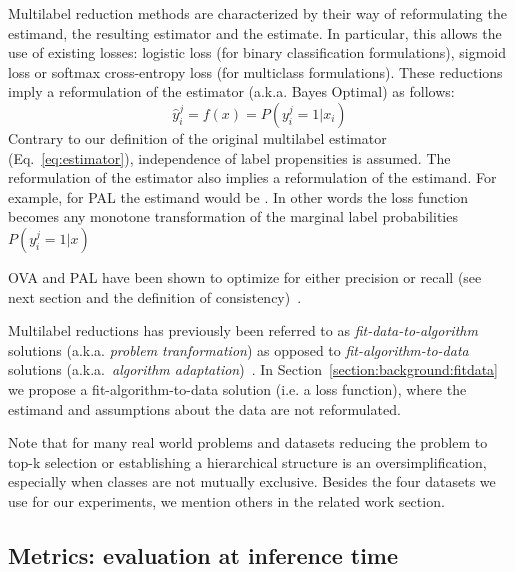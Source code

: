 \vspace{\baselineskip}

Multilabel reduction methods are characterized by their way of reformulating the estimand, the resulting estimator and the estimate. In particular, this allows the use of existing losses: logistic loss (for binary classification formulations), sigmoid loss or softmax cross-entropy loss (for multiclass formulations). These reductions imply a reformulation of the estimator (a.k.a. Bayes Optimal) as follows:
%
\begin{equation}
  \hat{y}_i^j = f(x) = P(y_i^j = 1 | x_i)
\end{equation}
%
Contrary to our definition of the original multilabel estimator (Eq.~\ref{eq:estimator}), independence of label propensities is assumed. The reformulation of the estimator also implies a reformulation of the estimand. For example, for PAL the estimand would be . In other words the loss function becomes any monotone transformation of the marginal label probabilities $ P(y_i^j = 1 | x)$ ~\cite{OVA2, multilabelMetrics, unifiedView}

OVA and PAL have been shown to optimize for either precision or recall (see next section and the definition of consistency)~\cite{multilabelReduction}.

Multilabel reductions has previously been referred to as \emph{fit-data-to-algorithm} solutions (a.k.a. \emph{problem tranformation}) as opposed to \emph{fit-algorithm-to-data} solutions (a.k.a.\ \emph{algorithm adaptation})~\cite{multilabelReview, multilabelReview2}. In Section~\ref{section:background:fitdata} we propose a fit-algorithm-to-data solution (i.e. a loss function), where the estimand and assumptions about the data are not reformulated.

Note that for many real world problems and datasets reducing the problem to top-k selection or establishing a hierarchical structure is an oversimplification, especially when classes are not mutually exclusive. Besides the four datasets we use for our experiments, we mention others in the related work section.

\subsection{Metrics: evaluation at inference time}
\label{section:background:metrics}

